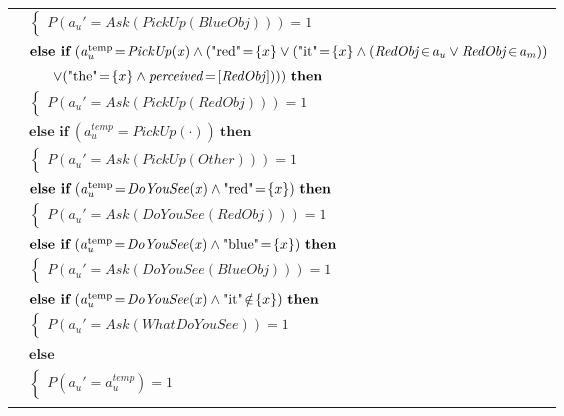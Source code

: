 \begin{footnotesize}
\begin{longtable}{p{1cm}l}
& \;\;\;\;\; $ \begin{cases}P(\mathit{a_u}'\!=\!\mathit{Ask(PickUp(BlueObj))})\!=\!1 \end{cases}$ \vspace{1mm} \\ & $ \textbf{else if} \ (\mathit{a_u^{\text{temp}}}\!=\!\mathit{PickUp({x})} \land (\text{"red"}\!=\!\mathit\{x\} \lor (\text{"it"}\!=\!\mathit\{x\} \land (\mathit{RedObj}\!\in\!\mathit{a_u} \lor \mathit{RedObj}\!\in\!\mathit{a_m})) $ \\ & $\ \ \ \ \  \lor (\text{"the"}\!=\!\mathit\{x\} \land \mathit{perceived}\!=\![\mathit{RedObj}]))) \ \textbf{then}$ \\
& \;\;\;\;\; $ \begin{cases}P(\mathit{a_u}'\!=\!\mathit{Ask(PickUp(RedObj))})\!=\!1 \end{cases}$ \vspace{1mm} \\ & $ \textbf{else if} \ (\mathit{a_u^{\text{temp}}}\!=\!\mathit{PickUp(\cdot)}) \ \textbf{then}$ \\
& \;\;\;\;\; $ \begin{cases}P(\mathit{a_u}'\!=\!\mathit{Ask(PickUp(Other))})\!=\!1 \end{cases}$ \vspace{1mm} \\ & $ \textbf{else if} \ (\mathit{a_u^{\text{temp}}}\!=\!\mathit{DoYouSee({x})} \land \text{"red"}\!=\!\mathit\{x\}) \ \textbf{then}$ \\
& \;\;\;\;\; $ \begin{cases}P(\mathit{a_u}'\!=\!\mathit{Ask(DoYouSee(RedObj))})\!=\!1 \end{cases}$ \vspace{1mm} \\ & $ \textbf{else if} \ (\mathit{a_u^{\text{temp}}}\!=\!\mathit{DoYouSee({x})} \land \text{"blue"}\!=\!\mathit\{x\}) \ \textbf{then}$ \\
& \;\;\;\;\; $ \begin{cases}P(\mathit{a_u}'\!=\!\mathit{Ask(DoYouSee(BlueObj))})\!=\!1 \end{cases}$ \vspace{1mm} \\ & $ \textbf{else if} \ (\mathit{a_u^{\text{temp}}}\!=\!\mathit{DoYouSee({x})} \land \text{"it"}\!\notin\!\mathit\{x\}) \ \textbf{then}$ \\
& \;\;\;\;\; $ \begin{cases}P(\mathit{a_u}'\!=\!\mathit{Ask(WhatDoYouSee)})\!=\!1 \end{cases}$ \vspace{1mm} \\ & $ \textbf{else}$ \\
& \;\;\;\;\; $ \begin{cases}P(\mathit{a_u}'\!=\!\mathit{{a_u^{\text{temp}}}})\!=\!1 \end{cases}$ \\ \\[-1mm]
\end{longtable}
\end{footnotesize}

